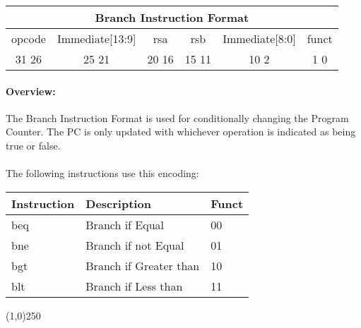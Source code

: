 \documentclass[letterpaper, 11pt]{article}
\begin{document}
\begin{center}
		\begin{tabular}{|c|c|c|c|c|c|}
			\multicolumn{6}{c}{Branch Instruction Format}\\ \hline
				\hspace{2pt} opcode \hspace{2pt} & \hspace{5pt} Immediate[13:9] \hspace{5pt} &  \hspace{4pt} rsa \hspace{4pt} & \hspace{4pt}rsb  \hspace{4pt}& \hspace{10pt}Immediate[8:0]  \hspace{10pt} & \hspace{3pt} funct \hspace{3pt}   \\	\hline
			31 \hfill 26& 25 \hfill 21 &20 \hfill  16& 15 \hfill  11&10 \hfill   2&1 \hfill   0\\ \hline
		
	\end{tabular}
\end{center}
\paragraph{Overview:} The Branch Instruction Format is used for conditionally changing the Program Counter.
The PC is only updated with whichever operation is indicated as being true or false.\\
\paragraph{}The following instructions use this encoding: \\
\begin{center}
	\begin{tabular}{|l|l|l|} \hline
			Instruction & Description 				& Funct\\ \hline
			beq			& Branch if Equal			& 00 \\ \hline
			bne			& Branch if not Equal		& 01 \\ \hline
			bgt			& Branch if Greater than	& 10 \\ \hline
			blt			& Branch if Less than		& 11 \\ \hline

\end{tabular}
\end{center}
\begin{center}
	\line(1,0){250}
\end{center}
\end{document}
